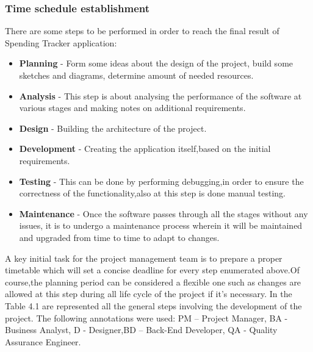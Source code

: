 \subsubsection{Time schedule establishment}
There are some steps to be performed in order to reach the final result of Spending Tracker application:
\begin{itemize}
	\item \textbf{Planning} - Form some ideas about the design of the project, build some sketches and diagrams, determine amount of needed resources.
	\item \textbf{Analysis} - This step is about analysing the performance of the software at various stages and making notes on additional requirements.
	\item \textbf{Design} - Building the architecture of the project.
	\item \textbf{Development} - Creating the application itself,based on the initial requirements.
	\item \textbf{Testing} - This can be done by performing debugging,in order to ensure the correctness of the functionality,also at this step is done manual testing.
	\item \textbf{Maintenance} - Once the software passes through all the stages without any issues, it is to undergo a maintenance process wherein it will be maintained and upgraded from time to time to adapt to changes.
\end{itemize}
A key initial task for the project management team is to prepare a proper timetable which will set a concise deadline for every step enumerated above.Of course,the planning period can be considered a flexible one such as changes are allowed at this step during all life cycle of the project if it's necessary. In the Table 4.1 are represented all the general steps involving the development of the project. The following annotations were used: PM – Project Manager, BA - Business Analyst, D - Designer,BD – Back-End Developer, QA  - Quality Assurance Engineer.

